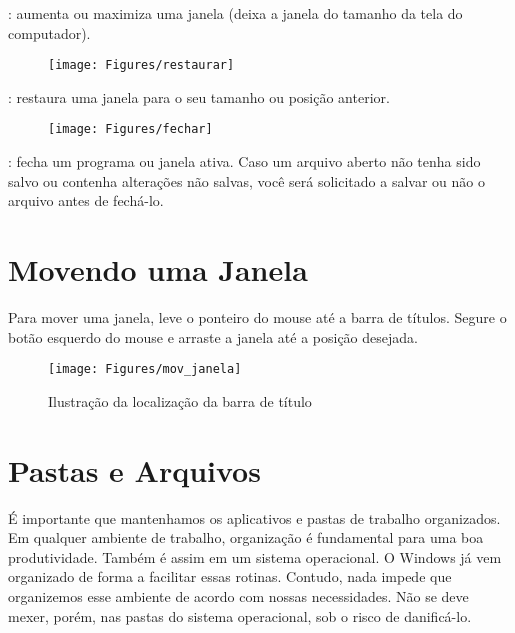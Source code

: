 \documentclass[hidelinks,12pt]{article}
\begin{document}
	\vspace{-1cm}{\bf Botão Maximizar}: aumenta ou maximiza uma janela (deixa a janela do tamanho da tela do computador).
	
	\begin{figure}[!h]
		\texttt{[image: Figures/restaurar]}
		\label{fig:restaurar}
	\end{figure}
	
	\vspace{-1cm}{\bf Botão Restaurar}: restaura uma janela para o seu tamanho ou posição anterior.
	
	\begin{figure}[!h]
		\texttt{[image: Figures/fechar]}
		\label{fig:fechar}
	\end{figure}
	
	\vspace{-1cm}{\bf Botão Fechar}: fecha um programa ou janela ativa. Caso um arquivo aberto não tenha sido salvo ou contenha alterações não salvas, você será solicitado a salvar ou não o arquivo antes de fechá-lo.
	
	
	\section{Movendo uma Janela}
	
	Para mover uma janela, leve o ponteiro do mouse até a barra de títulos. 	Segure o botão esquerdo do mouse e arraste a janela até a posição desejada.
	
	\begin{figure}[!h]
		\centering
		\texttt{[image: Figures/mov\_janela]}
		\caption{Ilustração da localização da barra de título}
		\label{fig:movendo janela}
		
	\end{figure}
	
	\section{Pastas e Arquivos}
	
	É importante que mantenhamos os aplicativos e pastas de trabalho organizados. Em qualquer ambiente de trabalho, organização é fundamental para uma boa produtividade. Também é assim em um sistema operacional. O Windows já vem organizado de forma a facilitar essas rotinas. Contudo, nada impede que organizemos esse ambiente de acordo com nossas necessidades. Não se deve mexer, porém, nas pastas do sistema operacional, sob o risco de danificá-lo.
\end{document}

